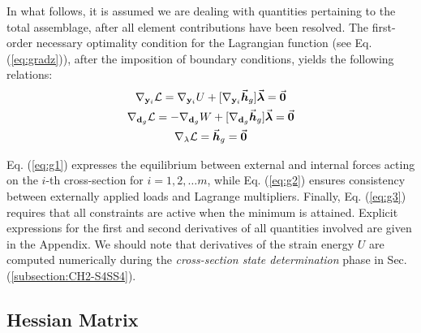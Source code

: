 In what follows, it is assumed we are dealing with quantities pertaining to
the total assemblage, after all element contributions have been resolved.
The first-order necessary optimality condition for the Lagrangian function (see 
Eq.
(\ref{eq:gradz})), after the imposition of boundary conditions, yields the
following relations:
\begin{subequations}
	\begin{gather}
		\nabla_{\mathbf{y}_i}\mathcal{L} = \nabla_{\mathbf{y}_i}U +
		[\nabla_{\mathbf{y}_i}\vec{\bm{h}}_g]\vec{\bm{\lambda}} = 
		\vec{\bm{0}}\label{eq:g1}\\
		\nabla_{\mathbf{d}_g}\mathcal{L} = -\nabla_{\mathbf{d}_g}W +
		[\nabla_{\mathbf{d}_g}\vec{\bm{h}}_g]\vec{\bm{\lambda}} = 
		\vec{\bm{0}}\label{eq:g2}\\
		\nabla_{\mathbf{\lambda}}\mathcal{L} = \vec{\bm{h}}_g = 
		\vec{\bm{0}}\label{eq:g3}
	\end{gather}\label{eq:eqtot}
\end{subequations}

\noindent Eq. (\ref{eq:g1}) expresses the equilibrium between external and
internal forces acting on the $i$-th cross-section for $i=1,2,\dots m$,
while Eq.
(\ref{eq:g2}) ensures consistency between externally applied loads and Lagrange
multipliers. Finally, Eq. (\ref{eq:g3}) requires that all constraints are
active when the minimum is attained. Explicit expressions for the first and
second derivatives of all quantities involved are given in the Appendix. We
should note that derivatives of the strain energy $U$ are computed
numerically during the \emph{cross-section state determination} phase in Sec.
(\ref{subsection:CH2-S4SS4}).

\subsection{Hessian Matrix}\label{subsection:CH2-S4SS2}

